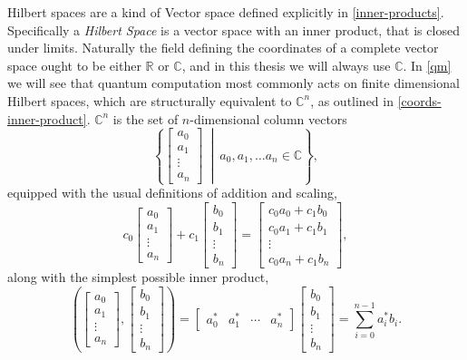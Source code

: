 Hilbert spaces are a kind of Vector space defined explicitly in \autoref{inner-products}. Specifically a \emph{Hilbert Space} is a vector space with an inner product, that is closed under limits. Naturally the field defining the coordinates of a complete vector space ought to be either $\mathbb{R}$ or $\mathbb{C}$, and in this thesis we will always use $\mathbb{C}$. In \autoref{qm} we will see that quantum computation most commonly acts on finite dimensional Hilbert spaces, which are structurally equivalent to $\mathbb{C}^n$, as outlined in \autoref{coords-inner-product}. $\mathbb{C}^n$ is the set of $n$-dimensional column vectors
\[\left\{\left[\begin{matrix} a_0\\a_1\\\vdots\\a_n\end{matrix}\right]\ \middle|\ a_0, a_1, \dots a_n \in \mathbb{C}\right\},\]
equipped with the usual definitions of addition and scaling,
\[
c_0\left[\begin{matrix} a_0\\a_1\\\vdots\\a_n\end{matrix}\right]
+
c_1\left[\begin{matrix} b_0\\b_1\\\vdots\\b_n\end{matrix}\right]
=
\left[\begin{matrix} c_0a_0+c_1b_0\\c_0a_1+c_1b_1\\\vdots\\c_0a_n+c_1b_n\end{matrix}\right],
\]
along with the simplest possible inner product,
\[
\left(
\left[\begin{matrix} a_0\\a_1\\\vdots\\a_n\end{matrix}\right]
,
\left[\begin{matrix} b_0\\b_1\\\vdots\\b_n\end{matrix}\right]
\right)
=
\left[\begin{matrix} a_0^*&a_1^*&\cdots&a_n^*\end{matrix}\right]
\left[\begin{matrix} b_0\\b_1\\\vdots\\b_n\end{matrix}\right]
= \sum_{i=0}^{n-1} a_i^*b_i.
\]

